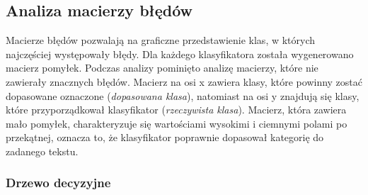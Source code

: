 
\subsection{Analiza macierzy błędów}
Macierze błędów pozwalają na graficzne przedstawienie klas, w których najczęściej występowały błędy. Dla każdego klasyfikatora została wygenerowano macierz pomyłek. Podczas analizy pominięto analizę macierzy, które nie zawierały znacznych błędów. Macierz na osi x zawiera klasy, które powinny zostać dopasowane oznaczone (\textit{dopasowana klasa}), natomiast na osi y znajdują się klasy, które przyporządkował klasyfikator (\textit{rzeczywista klasa}). Macierz, która zawiera mało pomyłek, charakteryzuje się wartościami wysokimi i ciemnymi polami po przekątnej, oznacza to, że klasyfikator poprawnie dopasował kategorię do zadanego tekstu.

\subsubsection{Drzewo decyzyjne}

